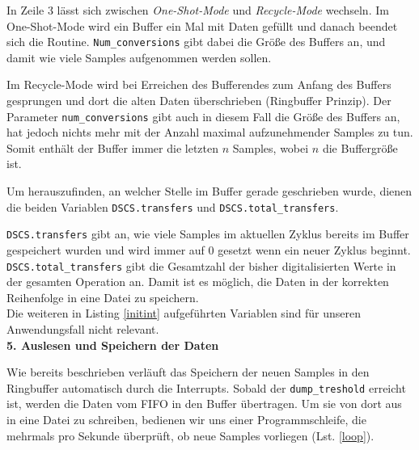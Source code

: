 \documentclass[12pt,a4paper,twoside,BCOR=12.5mm]{scrartcl}
\begin{document}
In Zeile 3 lässt sich zwischen \textit{One-Shot-Mode} und \textit{Recycle-Mode} wechseln. Im One-Shot-Mode wird ein Buffer ein Mal mit Daten gefüllt und danach beendet sich die Routine. \texttt{Num\_conversions} gibt dabei die Größe des Buffers an, und damit wie viele Samples aufgenommen werden sollen.

Im Recycle-Mode wird bei Erreichen des Bufferendes zum Anfang des Buffers gesprungen und dort die alten Daten überschrieben (Ringbuffer Prinzip). Der Parameter \texttt{num\_conversions} gibt auch in diesem Fall die Größe des Buffers an, hat jedoch nichts mehr mit der Anzahl maximal aufzunehmender Samples zu tun. Somit enthält der Buffer immer die letzten $n$ Samples, wobei $n$ die Buffergröße ist.

Um herauszufinden, an welcher Stelle im Buffer gerade geschrieben wurde, dienen die beiden Variablen \texttt{DSCS.transfers} und \texttt{DSCS.total\_transfers}. 

\texttt{DSCS.transfers} gibt an, wie viele Samples im aktuellen Zyklus bereits im Buffer gespeichert wurden und wird immer auf 0 gesetzt wenn ein neuer Zyklus beginnt. \texttt{DSCS.total\_transfers} gibt die Gesamtzahl der bisher digitalisierten Werte in der gesamten Operation an.
Damit ist es möglich, die Daten in der korrekten Reihenfolge in eine Datei zu speichern.\\

Die weiteren in Listing \ref{initint} aufgeführten Variablen sind für unseren Anwendungsfall nicht relevant.\\


\textbf{5. Auslesen und Speichern der Daten}


Wie bereits beschrieben verläuft das Speichern der neuen Samples in den Ringbuffer automatisch durch die Interrupts. Sobald der \texttt{dump\_treshold} erreicht ist, werden die Daten vom FIFO in den Buffer übertragen. Um sie von dort aus in eine Datei zu schreiben, bedienen wir uns einer Programmschleife, die mehrmals pro Sekunde überprüft, ob neue Samples vorliegen (Lst. \ref{loop}). 
\end{document}
